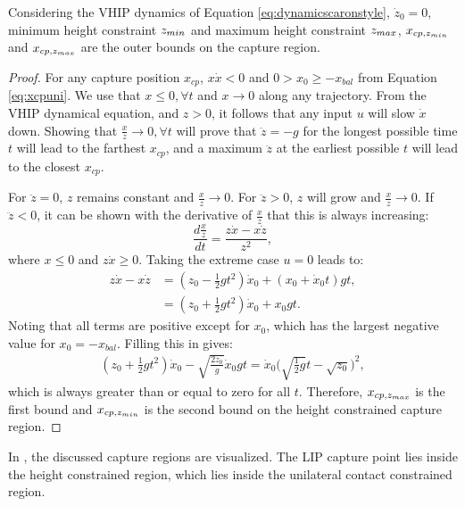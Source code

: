 \begin{lem}\label{lem:regionz}
Considering the \ac{VHIP} dynamics of Equation \eqref{eq:dynamicscaronstyle}, $\dot{z}_0=0$, minimum height constraint $z_{min}$ and maximum height constraint $z_{max}$, $x_{cp,z_{min}}$ and $x_{cp,z_{max}}$ are the outer bounds on the capture region.
\end{lem}
\begin{proof}
For any capture position $x_{cp}$, $x\dot{x}<0$ \cite{koolen2016balance} and $0>x_0\geq-x_{bal}$ from Equation \eqref{eq:xcpuni}. 
We use that $x \leq 0, \forall t$ and $x\rightarrow 0$ along any trajectory. From the \ac{VHIP} dynamical equation, and $z>0$, it follows that any input $u$ will slow $\dot{x}$ down. Showing that $\frac{x}{z}\rightarrow 0, \forall t$ will prove that $\ddot{z}=-g$ for the longest possible time $t$ will lead to the farthest $x_{cp}$, and a maximum $\ddot{z}$ at the earliest possible $t$ will lead to the closest $x_{cp}$. 

For $\ddot{z}=0$, $z$ remains constant and $\frac{x}{z}\rightarrow 0$. For $\ddot{z}>0$, $z$ will grow and $\frac{x}{z}\rightarrow 0$. If $\ddot{z}<0$, it can be shown with the derivative of $\frac{x}{z}$ that this is always increasing:
\begin{equation}
\frac{d\frac{x}{z}}{dt}= \frac{z\dot{x}-x\dot{z}}{z^2},
\end{equation}
where $x \leq 0$ and $z \dot{x} \geq 0$. Taking the extreme case $u=0$ leads to:
\begin{align}
	z\dot{x}-x\dot{z} &= (z_0 - \frac{1}{2}gt^2)\dot{x}_0 + (x_0 + \dot{x}_0 t)gt,\\
	&= (z_0 +\frac{1}{2}gt^2)\dot{x}_0 + x_0gt.
\end{align}
Noting that all terms are positive except for $x_0$, which has the largest negative value for $x_0=-x_{bal}$. Filling this in gives:
\begin{align}
	(z_0 +\frac{1}{2}gt^2)\dot{x}_0 - \sqrt{\frac{2z_0}{g}}\dot{x}_0gt = \dot{x}_0\bigg(\sqrt{\frac{1}{2}g}t - \sqrt{z_0}\bigg)^2,
\end{align}
which is always greater than or equal to zero for all $t$. Therefore, $x_{cp,z_{max}}$ is the first bound and $x_{cp,z_{min}}$ is the second bound on the height constrained capture region.
\end{proof}
In , the discussed capture regions are visualized. The LIP capture point lies inside the height constrained region, which lies inside the unilateral contact constrained region.
